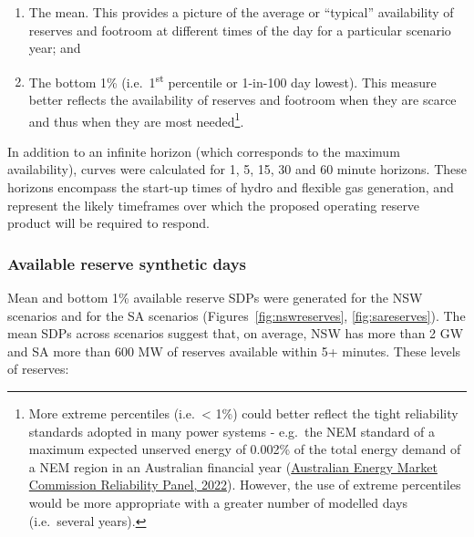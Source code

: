 \documentclass[12pt,a4paper,]{report}
\providecommand{\tightlist}{%
  \setlength{\itemsep}{0pt}\setlength{\parskip}{0pt}}
\begin{document}
\begin{enumerate}
\def\labelenumi{\arabic{enumi}.}
\tightlist
\item
  The mean. This provides a picture of the average or ``typical''
  availability of reserves and footroom at different times of the day
  for a particular scenario year; and
\item
  The bottom 1\% (i.e.~1\textsuperscript{st} percentile or 1-in-100 day
  lowest). This measure better reflects the availability of reserves and
  footroom when they are scarce and thus when they are most
  needed\footnote{More extreme percentiles (i.e.~\textless{} 1\%) could
    better reflect the tight reliability standards adopted in many power
    systems - e.g.~the NEM standard of a maximum expected unserved
    energy of 0.002\% of the total energy demand of a NEM region in an
    Australian financial year
    (\protect\hyperlink{ref-australianenergymarketcommissionreliabilitypanel2022ReviewReliability2022}{Australian
    Energy Market Commission Reliability Panel, 2022}). However, the use
    of extreme percentiles would be more appropriate with a greater
    number of modelled days (i.e.~several years).}.
\end{enumerate}

In addition to an infinite horizon (which corresponds to the maximum
availability), curves were calculated for 1, 5, 15, 30 and 60 minute
horizons. These horizons encompass the start-up times of hydro and
flexible gas generation, and represent the likely timeframes over which
the proposed operating reserve product will be required to respond.

\hypertarget{sec:reserves-reserveSDPs}{%
\subsubsection{Available reserve synthetic
days}\label{sec:reserves-reserveSDPs}}

Mean and bottom 1\% available reserve SDPs were generated for the NSW
scenarios and for the SA scenarios
(Figures~\ref{fig:nswreserves}, \ref{fig:sareserves}). The mean SDPs
across scenarios suggest that, on average, NSW has more than 2 GW and SA
more than 600 MW of reserves available within 5+ minutes. These levels
of reserves:
\end{document}
